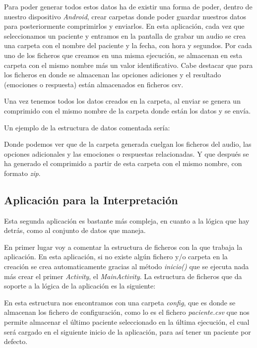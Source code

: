 Para poder generar todos estos datos ha de existir una forma de poder, dentro de nuestro dispositivo \textit{Android}, crear carpetas donde poder guardar nuestros datos para posteriormente comprimirlos y enviarlos. En esta aplicación, cada vez que seleccionamos un paciente y entramos en la pantalla de grabar un audio se crea una carpeta con el nombre del paciente y la fecha, con hora y segundos. Por cada uno de los ficheros que creamos en una misma ejecución, se almacenan en esta carpeta con el mismo nombre más un valor identificativo. Cabe destacar que para los ficheros en donde se almacenan las opciones adiciones y el resultado (emociones o respuesta) están almacenados en ficheros csv.

Una vez tenemos todos los datos creados en la carpeta, al enviar se genera un comprimido con el mismo nombre de la carpeta donde están los datos y se envía.

Un ejemplo de la estructura de datos comentada sería:


Donde podemos ver que de la carpeta generada cuelgan los ficheros del audio, las opciones adicionales y las emociones o respuestas relacionadas. Y que después se ha generado el comprimido a partir de esta carpeta con el mismo nombre, con formato \textit{zip}.
\subsection{Aplicación para la Interpretación}
Esta segunda aplicación es bastante más compleja, en cuanto a la lógica que hay detrás, como al conjunto de datos que maneja.

En primer lugar voy a comentar la estructura de ficheros con la que trabaja la aplicación. En esta aplicación, si no existe algún fichero y/o carpeta en la creación se crea automaticamente gracias al método \textit{inicio()} que se ejecuta nada más crear el primer \textit{Activity}, el \textit{MainActivity}. La estructura de ficheros que da soporte a la lógica de la aplicación es la siguiente:


En esta estructura nos encontramos con una carpeta \textit{config}, que es donde se almacenan los fichero de configuración, como lo es el fichero \textit{paciente.csv} que nos permite almacenar el último paciente seleccionado en la última ejecución, el cual será cargado en el siguiente inicio de la aplicación, para así tener un paciente por defecto.

